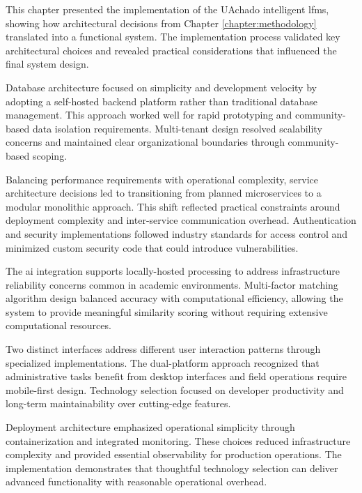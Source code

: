 This chapter presented the implementation of the UAchado intelligent \ac{lfms}, showing how architectural decisions from Chapter \ref{chapter:methodology}  translated into a functional system. The implementation process validated key architectural choices and revealed practical considerations that influenced the final system design.

Database architecture focused on simplicity and development velocity by adopting a self-hosted backend platform rather than traditional database management. This approach worked well for rapid prototyping and community-based data isolation requirements. Multi-tenant design resolved scalability concerns and maintained clear organizational boundaries through community-based scoping.
    
Balancing performance requirements with operational complexity, service architecture decisions led to transitioning from planned microservices to a modular monolithic approach. This shift reflected practical constraints around deployment complexity and inter-service communication overhead. Authentication and security implementations followed industry standards for access control and minimized custom security code that could introduce vulnerabilities.

The \ac{ai} integration supports locally-hosted processing to address infrastructure reliability concerns common in academic environments. Multi-factor matching algorithm design balanced accuracy with computational efficiency, allowing the system to provide meaningful similarity scoring without requiring extensive computational resources.

Two distinct interfaces address different user interaction patterns through specialized implementations. The dual-platform approach recognized that administrative tasks benefit from desktop interfaces and field operations require mobile-first design. Technology selection focused on developer productivity and long-term maintainability over cutting-edge features.

Deployment architecture emphasized operational simplicity through containerization and integrated monitoring. These choices reduced infrastructure complexity and provided essential observability for production operations. The implementation demonstrates that thoughtful technology selection can deliver advanced functionality with reasonable operational overhead.